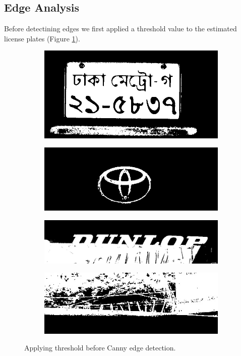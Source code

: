 \documentclass{standalone}
\begin{document}
\subsection{Edge Analysis}
Before detectining edges we first applied a threshold value to the estimated license plates (Figure \ref{fig:ThresholdCanny}).
\begin{figure}
\begin{subfigure}{.5\textwidth}
  \centering
  \includegraphics[width=.8\linewidth]{./img/sample/stage7-1.jpg}
\end{subfigure}
\begin{subfigure}{.5\textwidth}
  \centering
  \includegraphics[width=.8\linewidth]{./img/sample/stage7-2.jpg}
\end{subfigure}
\begin{subfigure}{.5\textwidth}
  \centering
  \includegraphics[width=.8\linewidth]{./img/sample/stage7-3.jpg}
\end{subfigure}
\begin{subfigure}{.5\textwidth}
  \centering
  \includegraphics[width=.8\linewidth]{./img/sample/stage7-4.jpg}
\end{subfigure}
\caption{Applying threshold before Canny edge detection.}
\label{fig:ThresholdCanny}
\end{figure}
\end{document}
